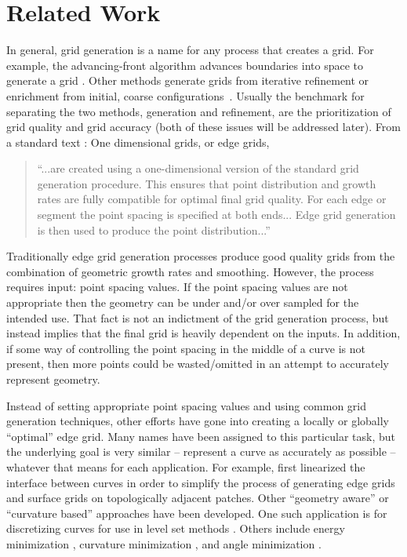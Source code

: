 \section{Related Work}
In general, grid generation is a name for any process that creates a grid.  
For example, the advancing-front algorithm advances boundaries into space 
to generate a grid \cite{lohner88}.  Other methods generate grids from 
iterative refinement or enrichment from initial, coarse 
configurations~\cite{shewchuk98,shewchuk02}.
Usually the benchmark for separating the two 
methods, generation and refinement, are the prioritization of grid quality and grid accuracy (both of these issues will be addressed later).  From a standard text \cite{thompson98}: One dimensional grids, or edge grids, 

\begin{quotation}
\noindent ``...are created using a one-dimensional version of the standard grid generation procedure.  This ensures that point distribution and growth rates are fully compatible for optimal final grid quality.  For each edge or segment the point spacing is specified at both ends... Edge grid generation is then used to produce the point distribution...''
\end{quotation} 

\noindent Traditionally edge grid generation processes produce good quality grids from the combination of geometric growth rates and smoothing.  However, the process requires input: point spacing values.  If the point spacing values are not appropriate then the geometry can be under and/or over sampled for the intended use.  That fact is not an indictment of the grid generation process, but instead implies that the final grid is heavily dependent on the inputs.  In addition, if some way of controlling the point spacing in the middle of a curve is not present, then more points could be wasted/omitted in an attempt to accurately represent geometry.

Instead of setting appropriate point spacing values and using common grid generation techniques, other efforts have gone into creating a locally or globally ``optimal'' edge grid.  Many names have been assigned to this particular task, but the underlying goal is very similar -- represent a curve as accurately as possible -- whatever that means for each application.  For example, \cite{laug04} first linearized the interface between curves in order to simplify the process of generating edge grids and surface grids on topologically adjacent patches.  Other ``geometry aware'' or ``curvature based'' approaches have been developed.  One such application is for discretizing curves for use in level set methods \cite{macklin06}.  Others include energy minimization \cite{hofer04}, curvature minimization \cite{zehiry10}, and angle minimization \cite{ebeida10}.

